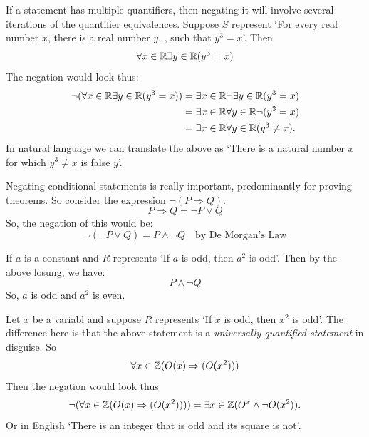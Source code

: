 \begin{example}
    If a statement has multiple quantifiers, then negating it will involve several iterations of the quantifier equivalences. Suppose $S$ represent `For every real number $x$, there is a real number $y$, , such that $y^{3} = x$'. Then 
    $$
    \forall x\in\mathbb{R}\exists y\in\mathbb{R}(y^{3}=x)
    $$
    The negation would look thus: 
    $$
        \begin{aligned}
            \neg(\forall x\in\mathbb{R}\exists y\in\mathbb{R}(y^{3}=x))&=\exists x\in\mathbb{R}\neg\exists y\in\mathbb{R}(y^{3}=x)\\
            &=\exists x\in\mathbb{R}\forall y\in\mathbb{R}\neg(y^{3}=x)\\
            &=\exists x\in\mathbb{R}\forall y\in\mathbb{R}(y^{3}\ne x).
        \end{aligned}
    $$
In natural language we can translate the above as `There is a natural number $x$ for which $y^{3}\ne x$ is false $y$'.     
\end{example}

Negating conditional statements is really important, predominantly for proving theorems. So consider the expression $\neg(P\Rightarrow Q)$. 
$$
P\Rightarrow Q = \neg P\lor Q
$$
So, the negation of this would be: 
$$
\neg (\neg P\lor Q) = P\land \neg Q \quad \text{by De Morgan's Law}
$$

\begin{example}
    If $a$ is a constant and $R$ represents `If $a$ is odd, then $a^{2}$ is odd'. Then by the above losung, we have:
    $$
    P\land \neg Q
    $$
    So, $a$ is odd and $a^{2}$ is even. 
\end{example}

\begin{example}
    Let $x$ be a variabl and suppose $R$ represents `If $x$ is odd, then $x^{2}$ is odd'. The difference here is that the above statement is a \emph{universally quantified statement} in disguise. So 
    $$
    \forall x\in\mathbb{Z}(O(x)\Rightarrow (O(x^{2})))
    $$
    Then the negation would look thus 
    $$
    \neg(\forall x\in\mathbb{Z}(O(x)\Rightarrow(O(x^{2}))))=\exists x\in\mathbb{Z}(O^{x}\land \neg O(x^{2})).
    $$
    Or in English `There is an integer that is odd and its square is not'. 
\end{example}

